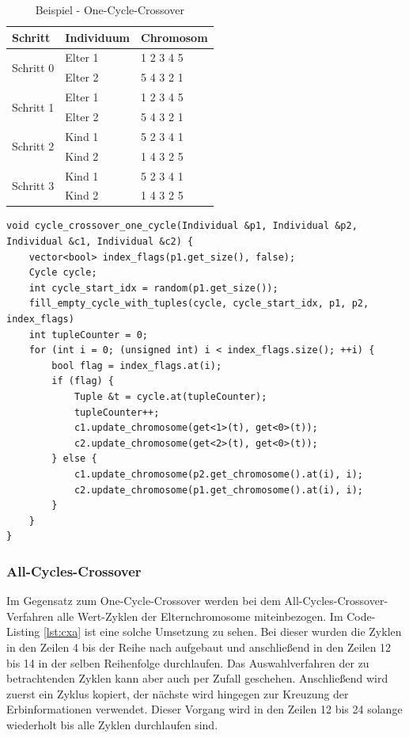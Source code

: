 \begin{table}[!htb]
\centering
\caption{Beispiel - One-Cycle-Crossover}
\begin{tabularx}{0.5\textwidth}{l|l|l}
Schritt & Individuum & Chromosom\\
\hline
\multirow{2}{*}{Schritt 0}
		& Elter 1 & 1 2 3 4 5\\
		& Elter 2 & 5 4 3 2 1\\
\hline
\multirow{2}{*}{Schritt 1}
		& Elter 1 & 1 \color{green}2 \color{black}3 \color{green}4 \color{black}5\\
		& Elter 2 & 5 \color{green}4 \color{black}3 \color{green}2 \color{black}1\\
\hline
\multirow{2}{*}{Schritt 2}
		& Kind 1 & 5 \color{green}2 \color{black}3 \color{green}4 \color{black}1\\
		& Kind 2 & 1 \color{green}4 \color{black}3 \color{green}2 \color{black}5\\
\hline
\multirow{2}{*}{Schritt 3}
		& Kind 1 & 5 2 3 4 1\\
		& Kind 2 & 1 4 3 2 5\\
\end{tabularx}
\label{tab:cxo}
\end{table}

\begin{minipage}[!htb]{\linewidth}
\begin{lstlisting}[caption={One-Cycle-Crossover}, firstnumber=1, captionpos=b, label=lst:cxo]
void cycle_crossover_one_cycle(Individual &p1, Individual &p2, Individual &c1, Individual &c2) {
	vector<bool> index_flags(p1.get_size(), false);
	Cycle cycle;
	int cycle_start_idx = random(p1.get_size());
	fill_empty_cycle_with_tuples(cycle, cycle_start_idx, p1, p2, index_flags)
	int tupleCounter = 0;
	for (int i = 0; (unsigned int) i < index_flags.size(); ++i) {
		bool flag = index_flags.at(i);
		if (flag) {
			Tuple &t = cycle.at(tupleCounter);
			tupleCounter++;
			c1.update_chromosome(get<1>(t), get<0>(t));
			c2.update_chromosome(get<2>(t), get<0>(t));
		} else {
 			c1.update_chromosome(p2.get_chromosome().at(i), i);
			c2.update_chromosome(p1.get_chromosome().at(i), i);
		}
	}
}
\end{lstlisting}
\end{minipage}

\subsubsection{All-Cycles-Crossover}
Im Gegensatz zum One-Cycle-Crossover werden bei dem All-Cycles-Crossover-Verfahren alle Wert-Zyklen der Elternchromosome miteinbezogen.
Im Code-Listing \ref{lst:cxa} ist eine solche Umsetzung zu sehen. Bei dieser wurden die Zyklen in den Zeilen 4 bis der Reihe nach aufgebaut und anschließend in den Zeilen 12 bis 14 in der selben Reihenfolge durchlaufen. 
Das Auswahlverfahren der zu betrachtenden Zyklen kann aber auch per Zufall geschehen. Anschließend wird zuerst ein Zyklus kopiert, der nächste wird hingegen zur Kreuzung der Erbinformationen verwendet. Dieser Vorgang wird in den Zeilen 12 bis 24 solange wiederholt bis alle Zyklen durchlaufen sind.

